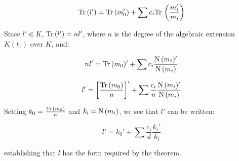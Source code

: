 \begin{enumerate}
$${\rm Tr\,}(l') = {\rm Tr\,}(m_0') + \sum c_i {\rm Tr\,} \left( \frac{m_i'}{m_i} \right)$$

Since $l' \in K$, ${\rm Tr\,}(l') = n l'$, where $n$ is the degree of the
algebraic extension $K(t_1)$ over $K$, and:

$$n l' = {\rm Tr\,}(m_0)' + \sum c_i \frac{{\rm N\,}(m_i)'}{{\rm N\,}(m_i)}$$

$$l' = \left[ \frac{{\rm Tr\,}(m_0)}{n} \right]' + \sum \frac{c_i}{n} \frac{{\rm N\,}(m_i)'}{{\rm N\,}(m_i)}$$

Setting $k_0 = \frac{{\rm Tr\,}(m_0)}{n}$ and $k_i = {\rm N\,}(m_i)$, we see that $l'$
can be written:

$$l' = k_0' + \sum \frac{c_i}{d} \frac{k_i'}{k_i}$$

establishing that $l$ has the form required by the theorem.


\end{enumerate}


\begin{comment}

Let $M = K(t_1,\ldots,t_{n-1})$,
so $L = M(t_n)$ is a simple elementary extension of $L$, and the
theorem holds for $M$.

If $L = M(t_n)$ is either an exponential or an algebraic extension
of $M$, then Theorem \ref{basic exponential properties}(4) or
Theorem \ref{basic algebraic properties}(4) establishes that
for $l \in L$, if $l' \in M$ then $l \in M$.  Since $l' \in K$
implies $l' \in M$, we conclude that $l \in M$ and the
theorem holds by induction.

The other case we must consider is when $L = M(t_n)$ is an
logarithm extension of $M$.  In this case, we again know
that $l' \in K$ implies that $l' \in M$, and Theorem
\ref{basic logarithmic properties}(5) tells us that
$l$ must have the form

$$l = m + c t_n \qquad l' = m' + c \frac{m_1'}{m_1}$$

\end{comment}


\begin{comment}

Since $L$ is formed from $K$ by a finite number of simple extensions,
consider the last extension and call it $\theta$, i.e, $L=M(\theta)$
where $K \subset M \subset L$, and $\theta$ is either algebraic,
logarithmic, or exponential over $M$.

Since $l' \in K$, $l' \in M$.  If
$\theta$ were either exponential or algebraic, then by Theorems
\ref{basic exponential properties} and \ref{basic algebraic properties}
$l$ would have to be in $M$.  On the other hand, if $\theta$ were
logarithmic, then by Theorem \ref{basic logarithmic properties} $l$
must have the form $c\theta + m$, where $m\in M$.  Applying this
argument inductively leads us to conclude that $l$ must have the
form...  (FIX AND FINISH THIS PROOF)

\end{comment}

\endtheorem
